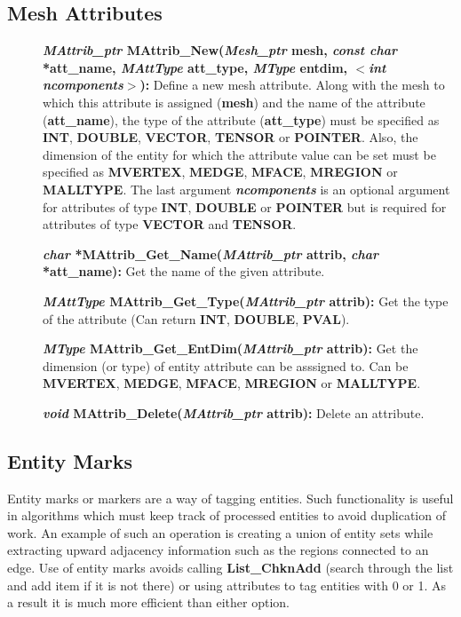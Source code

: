 \documentclass[12pt]{article}
\begin{document}
\newpage
\subsection{Mesh Attributes}

\begin{description}
  
\item[]{\bf {\em MAttrib\_ptr} MAttrib\_New({\em Mesh\_ptr} mesh, {\em
      const char} *att\_name, {\em MAttType} att\_type, {\em MType}
    entdim, $<${\em int ncomponents}$>$):} Define a new mesh
  attribute. Along with the mesh to which this attribute is assigned
  ({\bf mesh}) and the name of the attribute ({\bf att\_name}), the
  type of the attribute ({\bf att\_type}) must be specified as {\bf
    INT}, {\bf DOUBLE}, {\bf VECTOR}, {\bf TENSOR} or {\bf
    POINTER}. Also, the dimension of the entity for which the
  attribute value can be set must be specified as {\bf MVERTEX}, {\bf
    MEDGE}, {\bf MFACE}, {\bf MREGION} or {\bf MALLTYPE}. The last
  argument {\em {\bf ncomponents}} is an optional argument for attributes of
  type {\bf INT}, {\bf DOUBLE} or {\bf POINTER} but is required for
  attributes of type {\bf VECTOR} and {\bf TENSOR}.

\item[]{\bf {\em char} *MAttrib\_Get\_Name({\em MAttrib\_ptr}
    attrib, {\em char} *att\_name):} Get the name of the given attribute.
  
\item[]{\bf {\em MAttType}
    MAttrib\_Get\_Type({\em MAttrib\_ptr} attrib):} Get the type of
  the attribute (Can return {\bf INT}, {\bf DOUBLE},
  {\bf PVAL}).
  
\item[]{\bf {\em MType}
    MAttrib\_Get\_EntDim({\em MAttrib\_ptr} attrib):} Get the
  dimension (or type) of entity attribute can be asssigned to. Can be
  {\bf MVERTEX}, {\bf MEDGE}, {\bf MFACE}, {\bf MREGION}
  or {\bf MALLTYPE}.
  
\item[]{\bf {\em void} MAttrib\_Delete({\em MAttrib\_ptr}
    attrib):} Delete an attribute.

\end{description}

\newpage
\subsection{Entity Marks}

Entity marks or markers are a way of tagging entities. Such
functionality is useful in algorithms which must keep track of
processed entities to avoid duplication of work. An example of such an
operation is creating a union of entity sets while extracting upward
adjacency information such as the regions connected to an edge. Use of
entity marks avoids calling {\bf List\_ChknAdd} (search through the
list and add item if it is not there) or using attributes to tag
entities with 0 or 1. As a result it is much more efficient than
either option.
\end{document}
